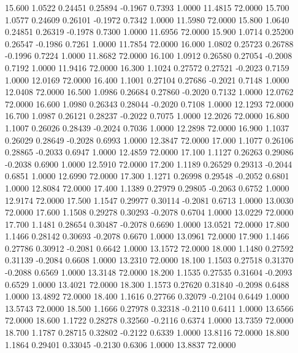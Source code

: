   15.600   1.0522   0.24451   0.25894  -0.1967   0.7393   1.0000  11.4815  72.0000
  15.700   1.0577   0.24609   0.26101  -0.1972   0.7342   1.0000  11.5980  72.0000
  15.800   1.0640   0.24851   0.26319  -0.1978   0.7300   1.0000  11.6956  72.0000
  15.900   1.0714   0.25200   0.26547  -0.1986   0.7261   1.0000  11.7854  72.0000
  16.000   1.0802   0.25723   0.26788  -0.1996   0.7224   1.0000  11.8682  72.0000
  16.100   1.0912   0.26580   0.27054  -0.2008   0.7192   1.0000  11.9416  72.0000
  16.300   1.1024   0.27572   0.27521  -0.2023   0.7159   1.0000  12.0169  72.0000
  16.400   1.1001   0.27104   0.27686  -0.2021   0.7148   1.0000  12.0408  72.0000
  16.500   1.0986   0.26684   0.27860  -0.2020   0.7132   1.0000  12.0762  72.0000
  16.600   1.0980   0.26343   0.28044  -0.2020   0.7108   1.0000  12.1293  72.0000
  16.700   1.0987   0.26121   0.28237  -0.2022   0.7075   1.0000  12.2026  72.0000
  16.800   1.1007   0.26026   0.28439  -0.2024   0.7036   1.0000  12.2898  72.0000
  16.900   1.1037   0.26029   0.28649  -0.2028   0.6993   1.0000  12.3847  72.0000
  17.000   1.1077   0.26106   0.28865  -0.2033   0.6947   1.0000  12.4859  72.0000
  17.100   1.1127   0.26263   0.29086  -0.2038   0.6900   1.0000  12.5910  72.0000
  17.200   1.1189   0.26529   0.29313  -0.2044   0.6851   1.0000  12.6990  72.0000
  17.300   1.1271   0.26998   0.29548  -0.2052   0.6801   1.0000  12.8084  72.0000
  17.400   1.1389   0.27979   0.29805  -0.2063   0.6752   1.0000  12.9174  72.0000
  17.500   1.1547   0.29977   0.30114  -0.2081   0.6713   1.0000  13.0030  72.0000
  17.600   1.1508   0.29278   0.30293  -0.2078   0.6704   1.0000  13.0229  72.0000
  17.700   1.1481   0.28654   0.30487  -0.2078   0.6690   1.0000  13.0521  72.0000
  17.800   1.1466   0.28142   0.30693  -0.2078   0.6670   1.0000  13.0961  72.0000
  17.900   1.1466   0.27786   0.30912  -0.2081   0.6642   1.0000  13.1572  72.0000
  18.000   1.1480   0.27592   0.31139  -0.2084   0.6608   1.0000  13.2310  72.0000
  18.100   1.1503   0.27518   0.31370  -0.2088   0.6569   1.0000  13.3148  72.0000
  18.200   1.1535   0.27535   0.31604  -0.2093   0.6529   1.0000  13.4021  72.0000
  18.300   1.1573   0.27620   0.31840  -0.2098   0.6488   1.0000  13.4892  72.0000
  18.400   1.1616   0.27766   0.32079  -0.2104   0.6449   1.0000  13.5743  72.0000
  18.500   1.1666   0.27978   0.32318  -0.2110   0.6411   1.0000  13.6566  72.0000
  18.600   1.1722   0.28278   0.32560  -0.2116   0.6374   1.0000  13.7359  72.0000
  18.700   1.1787   0.28715   0.32802  -0.2122   0.6339   1.0000  13.8116  72.0000
  18.800   1.1864   0.29401   0.33045  -0.2130   0.6306   1.0000  13.8837  72.0000

